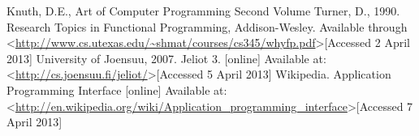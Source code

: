 \documentclass[11pt]{article} %
\begin{document}

\begin{thebibliography}{99}
	Knuth, D.E., Art of Computer Programming
	Second Volume
	Turner, D., 1990. Research Topics in Functional Programming, Addison-Wesley. Available through \textless \url{http://www.cs.utexas.edu/~shmat/courses/cs345/whyfp.pdf}\textgreater [Accessed 2 April 2013]
	University of Joensuu, 2007. Jeliot 3. [online] Available at: \textless\url{http://cs.joensuu.fi/jeliot/}\textgreater [Accessed 5 April 2013]
	Wikipedia. Application Programming Interface [online] Available at: \textless\url{http://en.wikipedia.org/wiki/Application_programming_interface}\textgreater [Accessed 7 April 2013]
\end{thebibliography}
\end{document}
